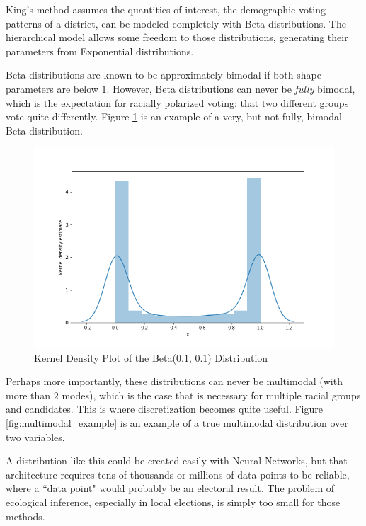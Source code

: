 King's method assumes the quantities of interest, the demographic voting patterns of a district, can be modeled completely with Beta distributions. The hierarchical model allows some freedom to those distributions, generating their parameters from Exponential distributions.

Beta distributions are known to be approximately bimodal if both shape parameters are below $1$. However, Beta distributions can never be \textit{fully} bimodal, which is the expectation for racially polarized voting: that two different groups vote quite differently. Figure \ref{fig:beta_example} is an example of a very, but not fully, bimodal Beta distribution.

\begin{figure}[ht]\centering
 \includegraphics[width=\linewidth]{figures/beta_example.png}
 \caption{Kernel Density Plot of the Beta($0.1$, $0.1$) Distribution}
 \label{fig:beta_example}
\end{figure}

Perhaps more importantly, these distributions can never be multimodal (with more than $2$ modes), which is the case that is necessary for multiple racial groups and candidates. This is where discretization becomes quite useful. Figure \ref{fig:multimodal_example} is an example of a true multimodal distribution over two variables.

A distribution like this could be created easily with Neural Networks, but that architecture requires tens of thousands or millions of data points to be reliable, where a ``data point" would probably be an electoral result. The problem of ecological inference, especially in local elections, is simply too small for those methods.

